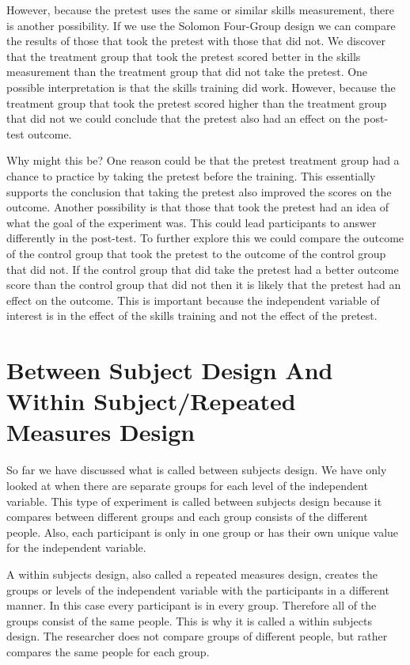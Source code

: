 \documentclass[]{book}
\theoremstyle{definition}
\theoremstyle{definition}
\theoremstyle{definition}
\theoremstyle{remark}
\begin{document}
However, because the pretest uses the same or similar skills
measurement, there is another possibility. If we use the Solomon
Four-Group design we can compare the results of those that took the
pretest with those that did not. We discover that the treatment group
that took the pretest scored better in the skills measurement than the
treatment group that did not take the pretest. One possible
interpretation is that the skills training did work. However, because
the treatment group that took the pretest scored higher than the
treatment group that did not we could conclude that the pretest also had
an effect on the post-test outcome.

Why might this be? One reason could be that the pretest treatment group
had a chance to practice by taking the pretest before the training. This
essentially supports the conclusion that taking the pretest also
improved the scores on the outcome. Another possibility is that those
that took the pretest had an idea of what the goal of the experiment
was. This could lead participants to answer differently in the
post-test. To further explore this we could compare the outcome of the
control group that took the pretest to the outcome of the control group
that did not. If the control group that did take the pretest had a
better outcome score than the control group that did not then it is
likely that the pretest had an effect on the outcome. This is important
because the independent variable of interest is in the effect of the
skills training and not the effect of the pretest.

\hypertarget{between-subject-design-and-within-subjectrepeated-measures-design}{%
\section{Between Subject Design And Within Subject/Repeated Measures
Design}\label{between-subject-design-and-within-subjectrepeated-measures-design}}

So far we have discussed what is called between subjects design. We have
only looked at when there are separate groups for each level of the
independent variable. This type of experiment is called between subjects
design because it compares between different groups and each group
consists of the different people. Also, each participant is only in one
group or has their own unique value for the independent variable.

A within subjects design, also called a repeated measures design,
creates the groups or levels of the independent variable with the
participants in a different manner. In this case every participant is in
every group. Therefore all of the groups consist of the same people.
This is why it is called a within subjects design. The researcher does
not compare groups of different people, but rather compares the same
people for each group.
\end{document}
